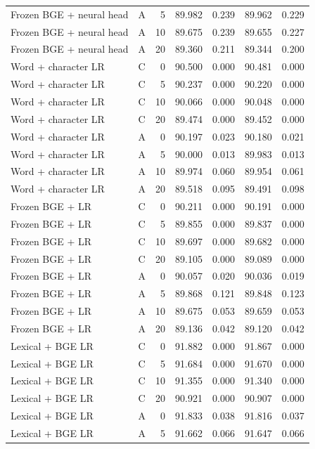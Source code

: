 \begin{longtable}{llrrrrr}
Frozen BGE + neural head & A & 5 & 89.982 & 0.239 & 89.962 & 0.229 \\
Frozen BGE + neural head & A & 10 & 89.675 & 0.239 & 89.655 & 0.227 \\
Frozen BGE + neural head & A & 20 & 89.360 & 0.211 & 89.344 & 0.200 \\
Word + character LR & C & 0 & 90.500 & 0.000 & 90.481 & 0.000 \\
Word + character LR & C & 5 & 90.237 & 0.000 & 90.220 & 0.000 \\
Word + character LR & C & 10 & 90.066 & 0.000 & 90.048 & 0.000 \\
Word + character LR & C & 20 & 89.474 & 0.000 & 89.452 & 0.000 \\
Word + character LR & A & 0 & 90.197 & 0.023 & 90.180 & 0.021 \\
Word + character LR & A & 5 & 90.000 & 0.013 & 89.983 & 0.013 \\
Word + character LR & A & 10 & 89.974 & 0.060 & 89.954 & 0.061 \\
Word + character LR & A & 20 & 89.518 & 0.095 & 89.491 & 0.098 \\
Frozen BGE + LR & C & 0 & 90.211 & 0.000 & 90.191 & 0.000 \\
Frozen BGE + LR & C & 5 & 89.855 & 0.000 & 89.837 & 0.000 \\
Frozen BGE + LR & C & 10 & 89.697 & 0.000 & 89.682 & 0.000 \\
Frozen BGE + LR & C & 20 & 89.105 & 0.000 & 89.089 & 0.000 \\
Frozen BGE + LR & A & 0 & 90.057 & 0.020 & 90.036 & 0.019 \\
Frozen BGE + LR & A & 5 & 89.868 & 0.121 & 89.848 & 0.123 \\
Frozen BGE + LR & A & 10 & 89.675 & 0.053 & 89.659 & 0.053 \\
Frozen BGE + LR & A & 20 & 89.136 & 0.042 & 89.120 & 0.042 \\
Lexical + BGE LR & C & 0 & 91.882 & 0.000 & 91.867 & 0.000 \\
Lexical + BGE LR & C & 5 & 91.684 & 0.000 & 91.670 & 0.000 \\
Lexical + BGE LR & C & 10 & 91.355 & 0.000 & 91.340 & 0.000 \\
Lexical + BGE LR & C & 20 & 90.921 & 0.000 & 90.907 & 0.000 \\
Lexical + BGE LR & A & 0 & 91.833 & 0.038 & 91.816 & 0.037 \\
Lexical + BGE LR & A & 5 & 91.662 & 0.066 & 91.647 & 0.066 \\

\end{longtable}
